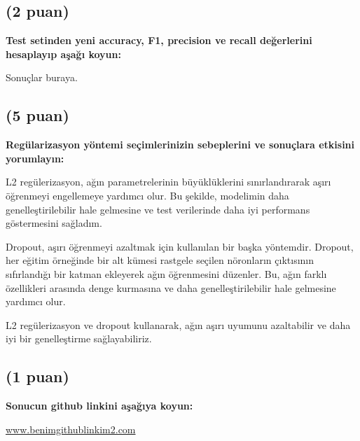 \documentclass[11pt]{article}
\begin{document}
\subsection{(2 puan)} \textbf{Test setinden yeni accuracy, F1, precision ve recall değerlerini hesaplayıp aşağı koyun:}

Sonuçlar buraya.

\subsection{(5 puan)} \textbf{Regülarizasyon yöntemi seçimlerinizin sebeplerini ve sonuçlara etkisini yorumlayın:}

L2 regülerizasyon, ağın parametrelerinin büyüklüklerini sınırlandırarak aşırı öğrenmeyi engellemeye yardımcı olur. Bu şekilde, modelimin daha genelleştirilebilir hale gelmesine ve test verilerinde daha iyi performans göstermesini sağladım.

Dropout, aşırı öğrenmeyi azaltmak için kullanılan bir başka yöntemdir. Dropout, her eğitim örneğinde bir alt kümesi rastgele seçilen nöronların çıktısının sıfırlandığı bir katman ekleyerek ağın öğrenmesini düzenler. Bu, ağın farklı özellikleri arasında denge kurmasına ve daha genelleştirilebilir hale gelmesine yardımcı olur.

L2 regülerizasyon ve dropout kullanarak, ağın aşırı uyumunu azaltabilir ve daha iyi bir genelleştirme sağlayabiliriz.

\subsection{(1 puan)} \textbf{Sonucun github linkini  aşağıya koyun:}

\url{www.benimgithublinkim2.com}
\end{document}
